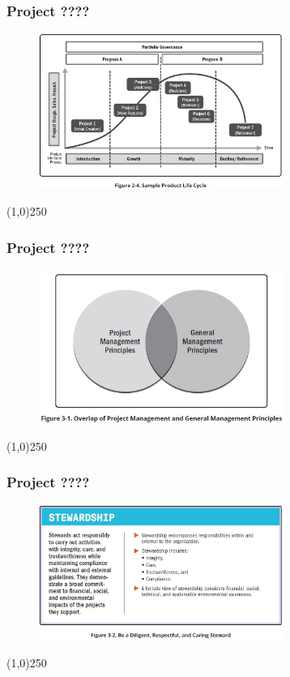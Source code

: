 \begin{frame}
\frametitle{Project ????}
 \begin{figure}
    \centering
        \includegraphics[width = 8cm]{../images/standard/Fig2-4.jpg}
    \label{standardfig:2-4}
 \end{figure}
\end{frame}
\begin{center}\line(1,0){250}\end{center}









\begin{frame}
\frametitle{Project ????}
 \begin{figure}
    \centering
        \includegraphics[width = 8cm]{../images/standard/Fig3-1.jpg}
    \label{standardfig:3-1}
 \end{figure}
\end{frame}
\begin{center}\line(1,0){250}\end{center}


\begin{frame}
\frametitle{Project ????}
 \begin{figure}
    \centering
        \includegraphics[width = 8cm]{../images/standard/Fig3-2.jpg}
    \label{standardfig:3-2}
 \end{figure}
\end{frame}
\begin{center}\line(1,0){250}\end{center}

